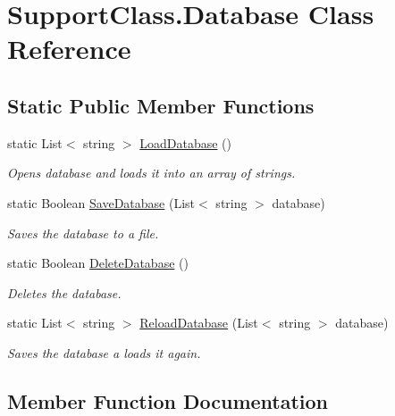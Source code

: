 \hypertarget{class_support_class_1_1_database}{}\section{Support\+Class.\+Database Class Reference}
\label{class_support_class_1_1_database}
\subsection*{Static Public Member Functions}
\begin{DoxyCompactItemize}
\item 
static List$<$ string $>$ \hyperlink{class_support_class_1_1_database_a5d04402f06e7d7c70fb8a9ac048d42b0}{Load\+Database} ()
\begin{DoxyCompactList}\small\item\em Opens database and loads it into an array of strings. \end{DoxyCompactList}\item 
static Boolean \hyperlink{class_support_class_1_1_database_aacf7c6e02e8d89b45bfd29452c373a14}{Save\+Database} (List$<$ string $>$ database)
\begin{DoxyCompactList}\small\item\em Saves the database to a file. \end{DoxyCompactList}\item 
static Boolean \hyperlink{class_support_class_1_1_database_af4b89d5e7bf9047f43dd17fb3ae3ca02}{Delete\+Database} ()
\begin{DoxyCompactList}\small\item\em Deletes the database. \end{DoxyCompactList}\item 
static List$<$ string $>$ \hyperlink{class_support_class_1_1_database_a5927f333d95715055cd1ef2593e91e54}{Reload\+Database} (List$<$ string $>$ database)
\begin{DoxyCompactList}\small\item\em Saves the database a loads it again. \end{DoxyCompactList}\end{DoxyCompactItemize}


\subsection{Member Function Documentation}
\hypertarget{class_support_class_1_1_database_af4b89d5e7bf9047f43dd17fb3ae3ca02}{}
